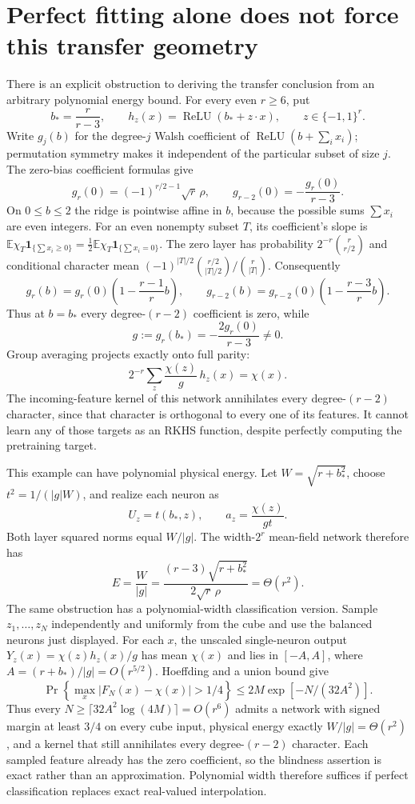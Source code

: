 \documentclass[11pt]{article}
\newcommand{\E}{\mathbb E}\newcommand{\R}{\mathbb R}
\newcommand{\relu}{\operatorname{ReLU}}\newcommand{\HH}{\mathcal H}
\begin{document}
\section{Perfect fitting alone does not force this transfer geometry}
There is an explicit obstruction to deriving the transfer conclusion from
an arbitrary polynomial energy bound. For every even $r\ge6$, put
\[
 b_*=\frac r{r-3},\qquad h_z(x)=\relu(b_*+z\cdot x),
 \qquad z\in\{-1,1\}^r.
\]
Write $g_j(b)$ for the degree-$j$ Walsh coefficient of
$\relu(b+\sum_i x_i)$; permutation symmetry makes it independent of
the particular subset of size $j$. The zero-bias coefficient formulas give
\[
 g_r(0)=(-1)^{r/2-1}\sqrt r\,\rho,\qquad
 g_{r-2}(0)=-\frac{g_r(0)}{r-3}.
\]
On $0\le b\le2$ the ridge is pointwise affine in $b$, because the
possible sums $\sum x_i$ are even integers. For an even nonempty subset
$T$, its coefficient's slope is
$\E\chi_T\mathbf1_{\{\sum x_i\ge0\}}
=\frac12\E\chi_T\mathbf1_{\{\sum x_i=0\}}$.
The zero layer has probability $2^{-r}\binom r{r/2}$ and conditional
character mean
$(-1)^{|T|/2}\binom{r/2}{|T|/2}/\binom r{|T|}$.
Consequently
\[
 g_r(b)=g_r(0)\left(1-\frac{r-1}{r}b\right),\qquad
 g_{r-2}(b)=g_{r-2}(0)\left(1-\frac{r-3}{r}b\right).
\]
Thus at $b=b_*$ every degree-$(r-2)$ coefficient is zero, while
\[
 g:=g_r(b_*)=-\frac{2g_r(0)}{r-3}\ne0.
\]
Group averaging projects exactly onto full parity:
\[
 2^{-r}\sum_z\frac{\chi(z)}g\,h_z(x)=\chi(x).
\]
The incoming-feature kernel of this network annihilates every
degree-$(r-2)$ character, since that character is orthogonal to every
one of its features. It cannot learn any of those targets as an RKHS
function, despite perfectly computing the pretraining target.

This example can have polynomial physical energy. Let
$W=\sqrt{r+b_*^2}$, choose $t^2=1/(|g|W)$, and realize each neuron as
\[
 U_z=t(b_*,z),\qquad a_z=\frac{\chi(z)}{gt}.
\]
Both layer squared norms equal $W/|g|$. The width-$2^r$ mean-field
network therefore has
\[
 E=\frac W{|g|}
   =\frac{(r-3)\sqrt{r+b_*^2}}{2\sqrt r\,\rho}=\Theta(r^2).
\]
The same obstruction has a polynomial-width classification version.
Sample $z_1,\ldots,z_N$ independently and uniformly from the cube and
use the balanced neurons just displayed. For each $x$, the unscaled
single-neuron output $Y_z(x)=\chi(z)h_z(x)/g$ has mean $\chi(x)$ and
lies in $[-A,A]$, where $A=(r+b_*)/|g|=O(r^{5/2})$.
Hoeffding and a union bound give
\[
 \Pr\left\{\max_x|F_N(x)-\chi(x)|>1/4\right\}
       \le2M\exp[-N/(32A^2)].
\]
Thus every $N\ge\lceil32A^2\log(4M)\rceil=O(r^6)$ admits a
network with signed margin at least $3/4$ on every cube input,
physical energy exactly $W/|g|=\Theta(r^2)$, and a kernel that still
annihilates every degree-$(r-2)$ character. Each sampled feature already
has the zero coefficient, so the blindness assertion is exact rather
than an approximation. Polynomial width therefore suffices if perfect
classification replaces exact real-valued interpolation.
\end{document}
